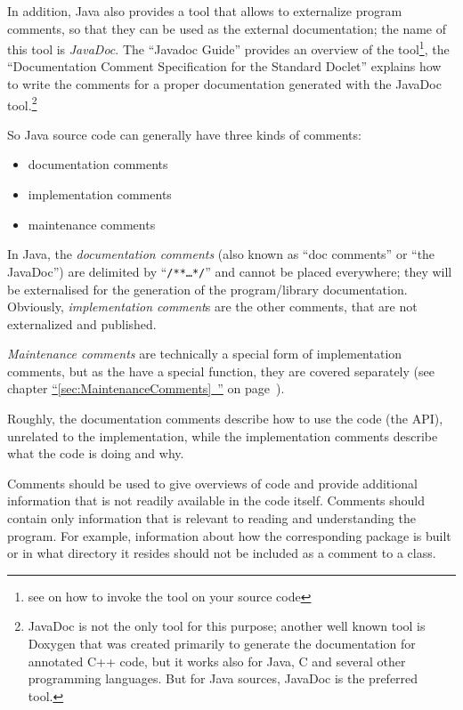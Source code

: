 \documentclass[11pt,a4paper, titlepage, parskip=half, headsepline, footsepline, cleardoublepage=current, headheight=1cm]{scrbook}
\newcommand*{\tqfullvref}[1]{\hyperref[{#1}]{“\ref*{#1}~\nameref*{#1}”} on page~\pageref{#1}}
\begin{document}
In addition, Java also provides a tool that allows to externalize program comments, so that they can be used as the external documentation; the name of this tool is \textit{JavaDoc}. The “Javadoc Guide”\autocite{ORACLE_DOC_JAVADOC_GUIDE} provides an overview of the tool\footnote{see \autocite{ORACLE_DOC_JAVADOC_MAN} on how to invoke the tool on your source code}, the “Documentation Comment Specification for the Standard Doclet”\autocite{ORACLE_DOC_JAVADOC_TAG} explains how to write the comments for a proper documentation generated with the JavaDoc tool.\footnote{JavaDoc is not the only tool for this purpose; another well known tool is Doxygen\autocite{DOXYGEN_HOMEPAGE} that was created primarily to generate the documentation for annotated C++ code, but it works also for Java, C and several other programming languages. But for Java sources, JavaDoc is the preferred tool.}

So Java source code can generally have three kinds of comments:
\begin{itemize}[nosep]
\item{documentation comments}
\item{implementation comments}
\item{maintenance comments}
\end{itemize}
In Java, the \textit{documentation comments} (also known as “doc comments” or “the JavaDoc”) are delimited by “\verb#/**…*/#” and cannot be placed everywhere; they will be externalised for the generation of the program/library documentation. Obviously, \textit{implementation comment}s are the other comments, that are not externalized and published.

\textit{Maintenance comments} are technically a special form of implementation comments, but as the have a special function, they are covered separately (see chapter \tqfullvref{sec:MaintenanceComments}).

Roughly, the documentation comments describe how to use the code (the API), unrelated to the implementation, while the implementation comments describe what the code is doing and why.

Comments should be used to give overviews of code and provide additional information that is not readily available in the code itself. Comments should contain only information that is relevant to reading and understanding the program. For example, information about how the corresponding package is built or in what directory it resides should not be included as a comment to a class.
\end{document}
